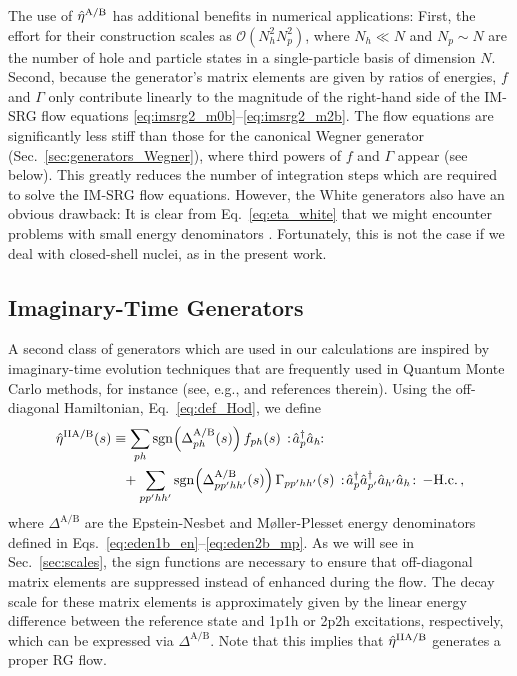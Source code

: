 The use of $\hat{\eta}^\text{A/B}$ has additional benefits in numerical
applications: First, the effort for their construction scales as
$\mathcal{O}(N_h^2N_p^2)$, where $N_h\ll N$ and $N_p\sim N$ are the
number of hole and particle states in a single-particle basis of
dimension $N$. Second, because the generator's matrix elements are
given by ratios of energies, $f$ and $\Gamma$ only contribute linearly
to the magnitude of the right-hand side of the IM-SRG flow equations
\eqref{eq:imsrg2_m0b}--\eqref{eq:imsrg2_m2b}. The flow equations are
significantly less stiff than those for the canonical Wegner generator
(Sec.~\ref{sec:generators_Wegner}), where third powers of $f$ and
$\Gamma$ appear (see below). This greatly reduces the number of
integration steps which are required to solve the IM-SRG flow
equations. However, the White generators also have an obvious
drawback: It is clear from Eq.~\eqref{eq:eta_white} that we might
encounter problems with small energy denominators
\cite{tsukiyama2012,hergert2013}. Fortunately, this is not the case if
we deal with closed-shell nuclei, as in the present work.

\subsection{\label{sec:generators_ImTime}Imaginary-Time Generators}
A second class of generators which are used in our calculations are
inspired by imaginary-time evolution techniques that are frequently
used in Quantum Monte Carlo methods, for instance (see, e.g.,
\cite{carlson2015} and references therein). Using the off-diagonal
Hamiltonian, Eq.~\eqref{eq:def_Hod}, we define
\begin{align}
  \etaO^\text{IIA/B}(s)
  &\equiv\sum_{ph} \mathrm{sgn}\!\left(\Delta^\text{A/B}_{ph}(s)\right)f_{ph}(s)\nord{\aaO_{p}\aO_{h}\!}\notag\\
  &\hphantom{=}
   +\sum_{pp'hh'}\mathrm{sgn}\!\left(\Delta^\text{A/B}_{pp'hh'}(s)\right)\Gamma_{pp'hh'}(s)\nord{\aaO_{p}\aaO_{p'}\aO_{h'}\aO_{h}}-\text{H.c.}\,,\label{eq:eta_imtime}
\end{align}
where $\Delta^\text{A/B}$ are the Epstein-Nesbet and M{\o}ller-Plesset
energy denominators defined in
Eqs.~\eqref{eq:eden1b_en}--\eqref{eq:eden2b_mp}. As we will see in
Sec.~\ref{sec:scales}, the sign functions are necessary to ensure that
off-diagonal matrix elements are suppressed instead of enhanced during
the flow. The decay scale for these matrix elements is approximately
given by the linear energy difference between the reference state and
1p1h or 2p2h excitations, respectively, which can be expressed via
$\Delta^\text{A/B}$. Note that this implies that $\hat{\eta}^\text{IIA/B}$
generates a proper RG flow.

